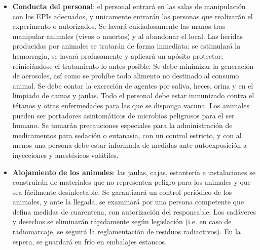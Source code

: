 \begin{itemize}[itemsep=0pt,parsep=0pt,topsep=0pt,partopsep=0pt]
    \item \textbf{Conducta del personal}: el personal entrará en las salas de manipulación con los EPIs adecuados, y unicamente entrarán las personas que realizarán el experimento o autorizados. Se lavará cuidadosamente las manos tras manipular animales (vivos o muertos) y al abandonar el local. Las heridas producidas por animales se tratarán de forma inmediata: se estimulará la hemorragia, se lavará profusamente y aplicará un apósito protector; reiniciándose el tratamiento lo antes posible. Se debe minimizar la generación de aerosoles, así como se prohíbe todo alimento no destinado al consumo animal. Se debe contar la excreción de agentes por saliva, heces, orina y en el limpiado de camas y jaulas. Todo el personal debe estar inmunizado contra el tétanos y otras enfermedades para las que se disponga vacuna. Los animales pueden ser portadores asintomáticos de microbios peligrosos para el ser humano. Se tomarán precauciones especiales para la administración de medicamentos para sedación o eutanasia, con un control estricto, y con al menos una persona debe estar informada de medidas ante autoexposición a inyecciones y anestésicos volátiles.
    \item \textbf{Alojamiento de los animales}: las jaulas, cajas, estantería e instalaciones se construirán de materiales que no representen peligro para los animales y que sea fácilmente desinfectable. Se garantizará un control periódico de los animales, y ante la llegada, se examinará por una persona competente que defina medidas de cuarentena, con autorización del responsable. Los cadáveres y desechos se eliminarán rápidamente según legislación (i.e. en caso de radiomarcaje, se seguirá la reglamentación de residuos radiactivos). En la espera, se guardará en frío en embalajes estancos.
\end{itemize}
